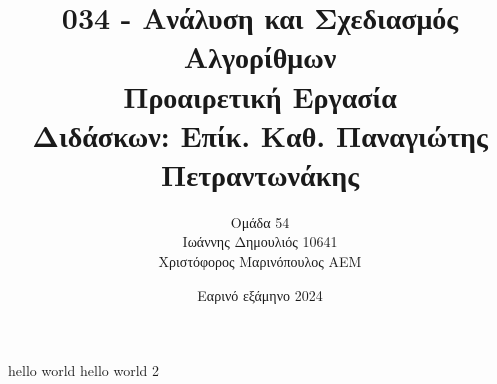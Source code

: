 \documentclass[10pt]{article}
\title{\vspace{-2cm}034 - Ανάλυση και Σχεδιασμός Αλγορίθμων\\ 
         Προαιρετική Εργασία \\
         \large Διδάσκων: Επίκ. Καθ. Παναγιώτης Πετραντωνάκης}
\author{Ομάδα 54 \\
        Ιωάννης Δημουλιός 10641 \\
        Χριστόφορος Μαρινόπουλος ΑΕΜ}
\date{Εαρινό εξάμηνο 2024}
\begin{document}
\maketitle
hello world
\newpage
hello world 2
\end{document}
